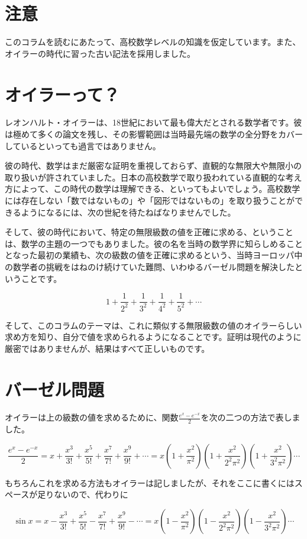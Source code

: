 \documentclass[a4paper]{jsarticle}
\theoremstyle{break}
\begin{document}
\setcounter{section}{-1}
\section{注意}
このコラムを読むにあたって、高校数学レベルの知識を仮定しています。また、オイラーの時代に習った古い記法を採用しました。
\section{オイラーって？}
レオンハルト・オイラーは、18世紀において最も偉大だとされる数学者です。彼は極めて多くの論文を残し、その影響範囲は当時最先端の数学の全分野をカバーしているといっても過言ではありません。

彼の時代、数学はまだ厳密な証明を重視しておらず、直観的な無限大や無限小の取り扱いが許されていました。日本の高校数学で取り扱われている直観的な考え方によって、この時代の数学は理解できる、といってもよいでしょう。高校数学には存在しない「数ではないもの」や「図形ではないもの」を取り扱うことができるようになるには、次の世紀を待たねばなりませんでした。

そして、彼の時代において、特定の無限級数の値を正確に求める、ということは、数学の主題の一つでもありました。彼の名を当時の数学界に知らしめることとなった最初の業績も、次の級数の値を正確に求めるという、当時ヨーロッパ中の数学者の挑戦をはねのけ続けていた難問、いわゆるバーゼル問題を解決したということです。

\[1+\frac{1}{2^2}+\frac{1}{3^2}+\frac{1}{4^2}+\frac{1}{5^2}+\cdots\]

そして、このコラムのテーマは、これに類似する無限級数の値のオイラーらしい求め方を知り、自分で値を求められるようになることです。証明は現代のように厳密ではありませんが、結果はすべて正しいものです。
\section{バーゼル問題}
オイラーは上の級数の値を求めるために、関数$\displaystyle\frac{e^x-e^{-x}}{2}$を次の二つの方法で表しました。

\[\frac{e^x-e^{-x}}{2}=x+\frac{x^3}{3!}+\frac{x^5}{5!}+\frac{x^7}{7!}+\frac{x^9}{9!}+\cdots=x\left(  1+\frac{x^2}{\pi^2}\right)\left(  1+\frac{x^2}{2^2\pi^2}\right)\left(  1+\frac{x^2}{3^2\pi^2}\right)\cdots\]

もちろんこれを求める方法もオイラーは記しましたが、それをここに書くにはスペースが足りないので、代わりに

\[\sin x=x-\frac{x^3}{3!}+\frac{x^5}{5!}-\frac{x^7}{7!}+\frac{x^9}{9!}-\cdots=x\left(  1-\frac{x^2}{\pi^2}\right)\left(  1-\frac{x^2}{2^2\pi^2}\right)\left(  1-\frac{x^2}{3^2\pi^2}\right)\cdots\]
\end{document}
